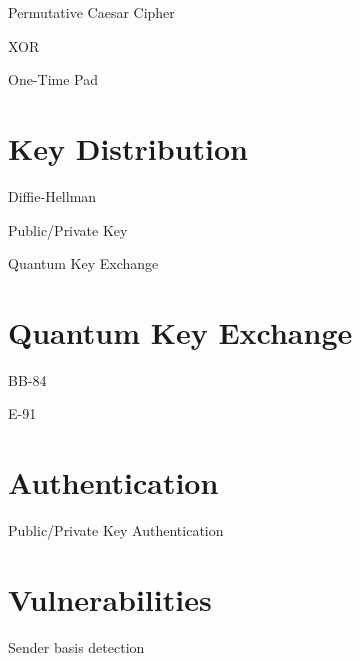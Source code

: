 \documentclass{beamer}
\begin{document}
	\begin{frame}{Permutative Caesar Cipher} %
		
	\end{frame}
	
	\begin{frame}{XOR} %
		
	\end{frame}
	
	\begin{frame}{One-Time Pad} %
		
	\end{frame}

	\section{Key Distribution}
	
	\begin{frame}{Diffie-Hellman} %
		
	\end{frame}
	
	\begin{frame}{Public/Private Key} %
		
	\end{frame}
	
	\begin{frame}{Quantum Key Exchange} %
		
	\end{frame}
	
	\section{Quantum Key Exchange}
	
	\begin{frame}{BB-84} %
		
	\end{frame}
	
	\begin{frame}{E-91} %
		
	\end{frame}
	
	\section{Authentication}
	
	\begin{frame}{Public/Private Key Authentication} %
		
	\end{frame}
	
	\section{Vulnerabilities}
	
	\begin{frame}{Sender basis detection} %
		
	\end{frame}
	

	\begin{frame}[plain]\end{frame}
	
\end{document}
